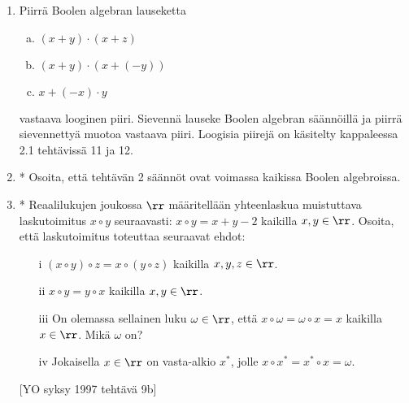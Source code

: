 \begin{tehtavasivu}
\begin{enumerate}
\item
Piirrä Boolen algebran lauseketta
\begin{enumerate}[a)]
\item $(x + y) \cdot (x + z)$
\item $(x + y) \cdot (x + (-y))$
\item $x + (-x) \cdot y$
\end{enumerate}
vastaava looginen piiri. Sievennä lauseke Boolen algebran säännöillä ja piirrä sievennettyä muotoa vastaava piiri. Loogisia piirejä on käsitelty kappaleessa 2.1 tehtävissä 11 ja 12.

\item
* Osoita, että tehtävän 2 säännöt ovat voimassa kaikissa Boolen algebroissa.

\item
* Reaalilukujen joukossa $\rr$ määritellään yhteenlaskua muistuttava laskutoimitus $x \circ y$ seuraavasti: $x \circ y = x + y - 2$ kaikilla $x, y \in \rr$. Osoita, että laskutoimitus toteuttaa seuraavat ehdot: 
\begin{itemize}
\item[i]
$(x \circ y) \circ z = x \circ (y \circ z)$ kaikilla $x, y, z \in \rr$. 
\item[ii]
$x \circ y = y \circ x$ kaikilla $x, y \in \rr$. 
\item[iii]
On olemassa sellainen luku $\omega \in \rr$, että $x \circ \omega = \omega \circ x = x$ kaikilla $x \in \rr$. Mikä $\omega$ on? 
\item[iv]
Jokaisella $x \in \rr$ on vasta-alkio $x^*$, jolle $x \circ x^* = x^* \circ x = \omega$. 
\end{itemize}
[YO syksy 1997 tehtävä 9b]

\end{enumerate}

\end{tehtavasivu}
